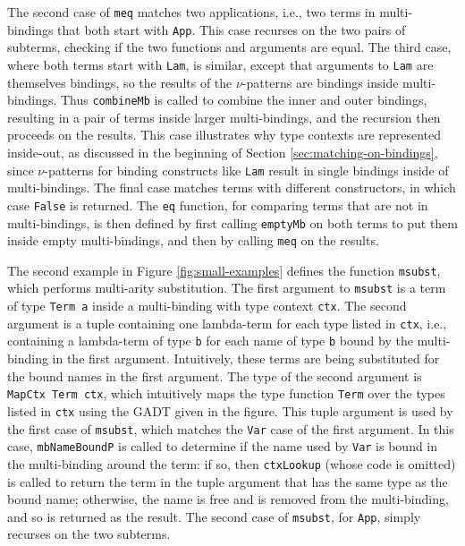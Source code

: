 \documentclass[natbib]{sigplanconf}
\begin{document}
The second case of \lstinline{meq} matches two applications, i.e., two
terms in multi-bindings that both start with \lstinline{App}.  This
case recurses on the two pairs of subterms, checking if the two
functions and arguments are equal.  The third case, where both terms
start with \lstinline{Lam}, is similar, except that arguments to
\lstinline{Lam} are themselves bindings, so the results of the
$\nu$-patterns are bindings inside multi-bindings. Thus
\lstinline{combineMb} is called to combine the inner and outer
bindings, resulting in a pair of terms inside larger multi-bindings,
and the recursion then proceeds on the results.  This case illustrates
why type contexts are represented inside-out, as discussed in the
beginning of Section \ref{sec:matching-on-bindings}, since
$\nu$-patterns for binding constructs like \lstinline{Lam} result in
single bindings inside of multi-bindings.  The final case matches
terms with different constructors, in which case \lstinline{False} is
returned. The \lstinline{eq} function, for comparing terms that are
not in multi-bindings, is then defined by first calling
\lstinline{emptyMb} on both terms to put them inside empty
multi-bindings, and then by calling \lstinline{meq} on the results.


The second example in Figure \ref{fig:small-examples} defines the
function \lstinline{msubst}, which performs multi-arity substitution.
The first argument to \lstinline{msubst} is a term of type
\lstinline{Term a} inside a multi-binding with type context
\lstinline{ctx}. The second argument is a tuple containing one
lambda-term for each type listed in \lstinline{ctx}, i.e., containing
a lambda-term of type \lstinline{b} for each name of type
\lstinline{b} bound by the multi-binding in the first argument.
Intuitively, these terms are being substituted for the bound names in
the first argument. The type of the second argument is
\lstinline{MapCtx Term ctx}, which intuitively maps the type function
\lstinline{Term} over the types listed in \lstinline{ctx} using the
GADT given in the figure.  This tuple argument is used by the first
case of \lstinline{msubst}, which matches the \lstinline{Var} case of
the first argument.  In this case, \lstinline{mbNameBoundP} is called
to determine if the name used by \lstinline{Var} is bound in the
multi-binding around the term: if so, then \lstinline{ctxLookup}
(whose code is omitted) is called to return the term in the tuple
argument that has the same type as the bound name; otherwise, the name
is free and is removed from the multi-binding, and so is returned as
the result.  The second case of \lstinline{msubst}, for
\lstinline{App}, simply recurses on the two subterms.
\end{document}
